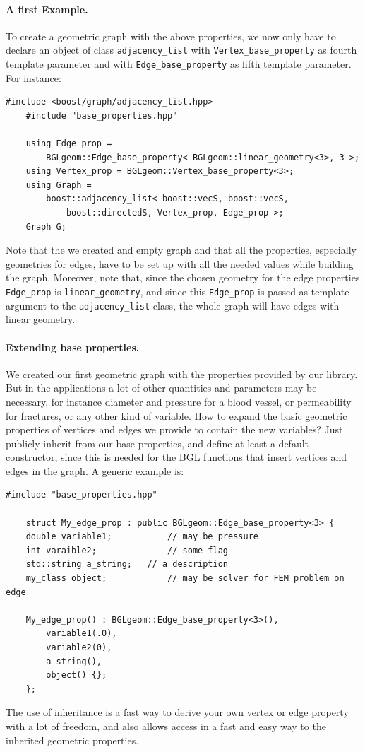 \documentclass[10pt]{article} %
\newcommand{\classname}[1]{\texttt{#1}}
\begin{document}
	\paragraph{A first Example.} To create a geometric graph with the above properties, we now only have to declare an object of class \classname{adjacency\_list} with \classname{Vertex\_base\_property} as fourth template parameter and with \classname{Edge\_base\_property} as fifth template parameter. For instance:
	\begin{lstlisting}[frame=single]
	#include <boost/graph/adjacency_list.hpp>
	#include "base_properties.hpp"
	
	using Edge_prop = 
		BGLgeom::Edge_base_property< BGLgeom::linear_geometry<3>, 3 >;
	using Vertex_prop = BGLgeom::Vertex_base_property<3>;
	using Graph = 
		boost::adjacency_list< boost::vecS, boost::vecS, 
			boost::directedS, Vertex_prop, Edge_prop >;
	Graph G;
	\end{lstlisting}
	Note that the we created and empty graph and that all the properties, especially geometries for edges, have to be set up with all the needed values while building the graph. Moreover, note that, since the chosen geometry for the edge properties \texttt{Edge\_prop} is \texttt{linear\_geometry}, and since this \texttt{Edge\_prop} is passed as template argument to the \classname{adjacency\_list} class, the whole graph will have edges with linear geometry.
	\paragraph{Extending base properties.} We created our first geometric graph with the properties provided by our library. But in the applications a lot of other quantities and parameters may be necessary, for instance diameter and pressure for a blood vessel, or permeability for fractures, or any other kind of variable. How to expand the basic geometric properties of vertices and edges we provide to contain the new variables? Just publicly inherit from our base properties, and define at least a default constructor, since this is needed for the BGL functions that insert vertices and edges in the graph. A generic example is:
	\begin{lstlisting}[frame=single]
	#include "base_properties.hpp"
	
	struct My_edge_prop : public BGLgeom::Edge_base_property<3> {
	double variable1;			// may be pressure
	int varaible2;				// some flag
	std::string a_string;	// a description
	my_class object;			// may be solver for FEM problem on edge
	
	My_edge_prop() : BGLgeom::Edge_base_property<3>(),
		variable1(.0),
		variable2(0),
		a_string(),
		object() {};	
	};
	\end{lstlisting}
	The use of inheritance is a fast way to derive your own vertex or edge property with a lot of freedom, and also allows access in a fast and easy way to the inherited geometric properties.
\end{document}
